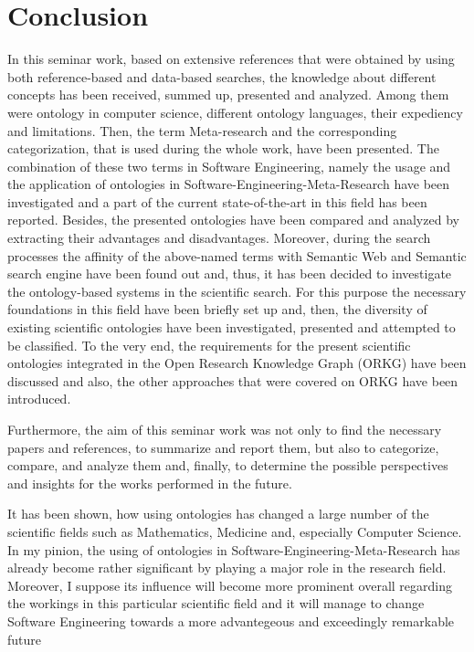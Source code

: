 
\section{Conclusion}
\label{ch:Conclusion}

In this seminar work, based on extensive references that were obtained by using both reference-based and data-based searches, the knowledge about different concepts has been received, summed up, presented and analyzed. Among them were ontology in computer science, different ontology languages, their expediency and limitations. Then, the term Meta-research and the corresponding categorization, that is used during the whole work, have been presented. The combination of these two terms in Software Engineering, namely the usage and the application of ontologies in Software-Engineering-Meta-Research have been investigated and a part of the current state-of-the-art in this field has been reported. Besides, the presented ontologies have been compared and analyzed by extracting their advantages and disadvantages. Moreover, during the search processes the affinity of the above-named terms with Semantic Web and Semantic search engine have been found out and, thus, it has been decided to investigate the ontology-based systems in the scientific search. For this purpose the necessary foundations in this field have been briefly set up and, then, the diversity of existing scientific ontologies have been investigated, presented and attempted to be classified. To the very end, the requirements for the present scientific ontologies integrated in the Open Research Knowledge Graph (ORKG) have been discussed and also, the other approaches that were covered on ORKG have been introduced.

Furthermore, the aim of this seminar work was not only to find the necessary papers and references, to summarize and report them, but also to categorize, compare, and analyze them and, finally, to determine the possible perspectives and insights for the works performed in the future. 

It has been shown, how using ontologies has changed a large number of the scientific fields such as Mathematics, Medicine and, especially Computer Science. In my pinion, the using of  ontologies in Software-Engineering-Meta-Research has already become rather significant by playing a major role in the research field. Moreover, I suppose its influence will become more prominent overall regarding the workings in this particular scientific field and it will manage to change Software Engineering towards a more advantegeous and exceedingly remarkable future